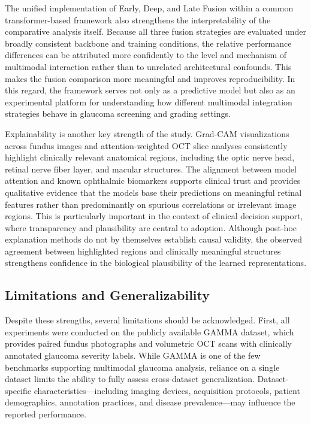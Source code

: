 \documentclass[preprint,12pt]{elsarticle}
\begin{document}
The unified implementation of Early, Deep, and Late Fusion within a common transformer-based framework also strengthens the interpretability of the comparative analysis itself. Because all three fusion strategies are evaluated under broadly consistent backbone and training conditions, the relative performance differences can be attributed more confidently to the level and mechanism of multimodal interaction rather than to unrelated architectural confounds. This makes the fusion comparison more meaningful and improves reproducibility. In this regard, the framework serves not only as a predictive model but also as an experimental platform for understanding how different multimodal integration strategies behave in glaucoma screening and grading settings.

Explainability is another key strength of the study. Grad-CAM visualizations across fundus images and attention-weighted OCT slice analyses consistently highlight clinically relevant anatomical regions, including the optic nerve head, retinal nerve fiber layer, and macular structures. The alignment between model attention and known ophthalmic biomarkers supports clinical trust and provides qualitative evidence that the models base their predictions on meaningful retinal features rather than predominantly on spurious correlations or irrelevant image regions. This is particularly important in the context of clinical decision support, where transparency and plausibility are central to adoption. Although post-hoc explanation methods do not by themselves establish causal validity, the observed agreement between highlighted regions and clinically meaningful structures strengthens confidence in the biological plausibility of the learned representations.

\subsection{Limitations and Generalizability}

Despite these strengths, several limitations should be acknowledged. First, all experiments were conducted on the publicly available GAMMA dataset, which provides paired fundus photographs and volumetric OCT scans with clinically annotated glaucoma severity labels. While GAMMA is one of the few benchmarks supporting multimodal glaucoma analysis, reliance on a single dataset limits the ability to fully assess cross-dataset generalization. Dataset-specific characteristics—including imaging devices, acquisition protocols, patient demographics, annotation practices, and disease prevalence—may influence the reported performance.
\end{document}
